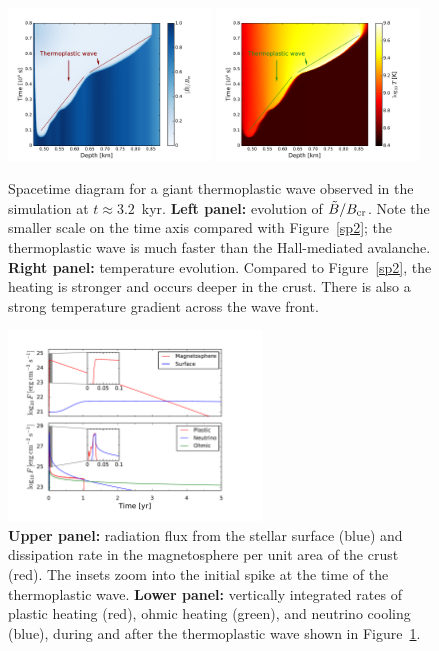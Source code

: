 \begin{figure}[htbp]
\centering
\includegraphics[width=0.48\textwidth]{pics/chap2/sp1.pdf} 
\includegraphics[width=0.48\textwidth]{pics/chap2/sp1_1.pdf} 
\caption[Spacetime diagram for a giant thermoplastic wave]{Spacetime diagram for a giant thermoplastic wave observed in the simulation at $t\approx 3.2$~kyr.
\textbf{Left panel:} evolution of $\tilde{B}/B_{\rm cr}$. 
Note the smaller scale on the time axis compared with Figure~\ref{sp2}; the thermoplastic wave is much faster than the Hall-mediated avalanche. \textbf{Right panel:} temperature evolution. 
Compared to Figure~\ref{sp2}, the heating is stronger and occurs deeper in the crust.
There is also a strong temperature gradient across the wave front. 
}
\label{sp1}
\end{figure}

\begin{figure}[h]
\centering
\includegraphics[width=0.6\textwidth]{pics/chap2/figz1.pdf} 
\caption[Radiation flux from the outburst simulation for a giant thermoplastic wave]{
\textbf{Upper panel:} radiation flux from the stellar surface (blue) and dissipation rate in the 
magnetosphere per unit area of the crust (red). The insets  zoom into the initial 
spike at the time of the thermoplastic wave.
\textbf{Lower panel:} vertically integrated rates of plastic heating (red), ohmic heating (green), and neutrino cooling (blue), during and after the thermoplastic wave shown in Figure~\ref{sp1}.
}
\label{figz1}
\end{figure}

